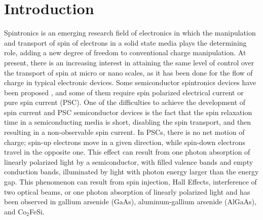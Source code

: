 \documentclass[floatfix,prb,aps,superscriptaddress,showpacs,11pt,preprint,letterpaper]{revtex4}
\begin{document}
\section{Introduction}
\label{sec:introduction}


Spintronics is an emerging research field of electronics in which the
manipulation and transport of spin of electrons in a solid state 
media plays the determining role, adding a new degree of freedom to
conventional charge manipulation.\cite{wolfSC04,fabianAPS07}
% 
At present, there is an increasing interest in attaining the same level of
control over the transport of spin at micro or nano scales, as it has been done for
the flow of charge in typical electronic devices.\cite{awschalomNP2007} Some
semiconductor spintronics devices have been proposed \cite{majumdarAPL06,
dattaAPL90,gotteNat16,pershinPRB08}, and some of them require spin polarized
electrical current \cite{awschalomSSBM13} or pure spin current (PSC).
% 
One of the difficulties to achieve the development of spin current and PSC
semiconductor devices is the fact that the spin relaxation time in a
semiconducting media is short, disabling the spin transport, and then resulting
in a non-observable spin current.\cite{murakamiSc03}
% 
In PSCs, there is no net
motion of charge; spin-up electrons move in a given direction, while spin-down
electrons travel in the opposite one. 
This effect can result from one photon absorption of linearly polarized light
by a semiconductor, with filled valence bands and empty conduction bands,
illuminated by light with photon energy larger than the energy gap.
This phenomenon can result from spin
injection,\cite{malPRB03} Hall Effects,\cite{sinovaPRB04} interference of two
optical beams,\cite{bhatPRL00, najmaiePRB03} or one photon absorption of
linearly polarized light\cite{bhatPRL05} and has been observed in gallium
arsenide (GaAs),\cite{zhaoPRL2006, stevensPRL03} aluminum-gallium arsenide
(AlGaAs),\cite{stevensPRL03} and Co$_2$FeSi.\cite{kimuraNGPAM12}
\end{document}
